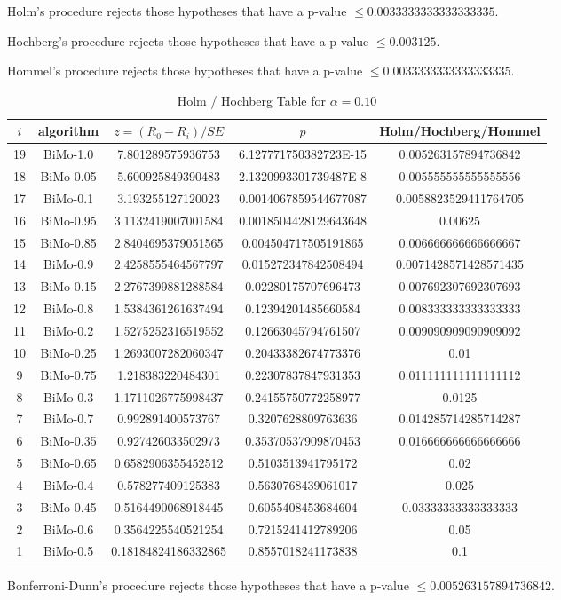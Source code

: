 \documentclass[a4paper,10pt]{article}
\begin{document}
\begin{landscape}
Holm's procedure rejects those hypotheses that have a p-value $\le0.0033333333333333335$.


Hochberg's procedure rejects those hypotheses that have a p-value $\le0.003125$.


Hommel's procedure rejects those hypotheses that have a p-value $\le0.0033333333333333335$.


\begin{table}[!htp]
\centering\tiny
\caption{Holm / Hochberg Table for $\alpha=0.10$}
\begin{tabular}{ccccc}
$i$&algorithm&$z=(R_0 - R_i)/SE$&$p$&Holm/Hochberg/Hommel\\
\hline
19&BiMo-1.0&7.801289575936753&6.127771750382723E-15&0.005263157894736842\\
18&BiMo-0.05&5.600925849390483&2.1320993301739487E-8&0.005555555555555556\\
17&BiMo-0.1&3.193255127120023&0.0014067859544677087&0.0058823529411764705\\
16&BiMo-0.95&3.1132419007001584&0.0018504428129643648&0.00625\\
15&BiMo-0.85&2.8404695379051565&0.004504717505191865&0.006666666666666667\\
14&BiMo-0.9&2.4258555464567797&0.015272347842508494&0.0071428571428571435\\
13&BiMo-0.15&2.2767399881288584&0.02280175707696473&0.007692307692307693\\
12&BiMo-0.8&1.5384361261637494&0.12394201485660584&0.008333333333333333\\
11&BiMo-0.2&1.5275252316519552&0.12663045794761507&0.009090909090909092\\
10&BiMo-0.25&1.2693007282060347&0.20433382674773376&0.01\\
9&BiMo-0.75&1.218383220484301&0.22307837847931353&0.011111111111111112\\
8&BiMo-0.3&1.1711026775998437&0.24155750772258977&0.0125\\
7&BiMo-0.7&0.992891400573767&0.3207628809763636&0.014285714285714287\\
6&BiMo-0.35&0.927426033502973&0.35370537909870453&0.016666666666666666\\
5&BiMo-0.65&0.6582906355452512&0.5103513941795172&0.02\\
4&BiMo-0.4&0.578277409125383&0.5630768439061017&0.025\\
3&BiMo-0.45&0.5164490068918445&0.6055408453684604&0.03333333333333333\\
2&BiMo-0.6&0.3564225540521254&0.7215241412789206&0.05\\
1&BiMo-0.5&0.18184824186332865&0.8557018241173838&0.1\\
\hline
\end{tabular}
\end{table}
Bonferroni-Dunn's procedure rejects those hypotheses that have a p-value $\le0.005263157894736842$.



\end{landscape}
\end{document}
